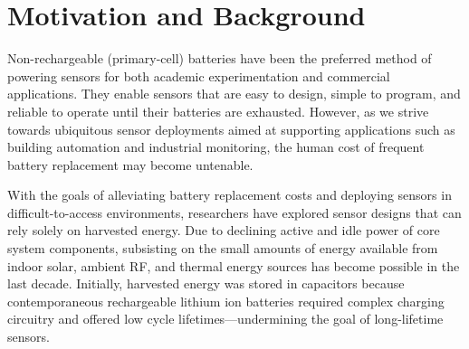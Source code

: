 \section{Motivation and Background}
\label{sec:capacity_intro}

Non-rechargeable (primary-cell) batteries have been
the preferred method of powering sensors for both academic experimentation
and commercial applications. They enable sensors that are easy to design, simple to program,
and reliable to operate until their batteries are exhausted.
However, as we strive towards ubiquitous sensor deployments aimed
at supporting applications such as building automation and industrial monitoring,
the human cost of frequent battery replacement may become untenable.

With the goals of alleviating battery replacement costs and deploying sensors
in difficult-to-access environments, researchers have explored sensor designs that can
rely solely on harvested energy. Due to declining active and idle power of core
system components, subsisting on the
small amounts of energy available from indoor solar, ambient RF, and thermal
energy sources has become possible in the last
decade. Initially,
harvested energy was stored in capacitors because contemporaneous rechargeable
lithium ion batteries required complex charging circuitry
and offered low cycle lifetimes---undermining
the goal of long-lifetime sensors.
%
%



